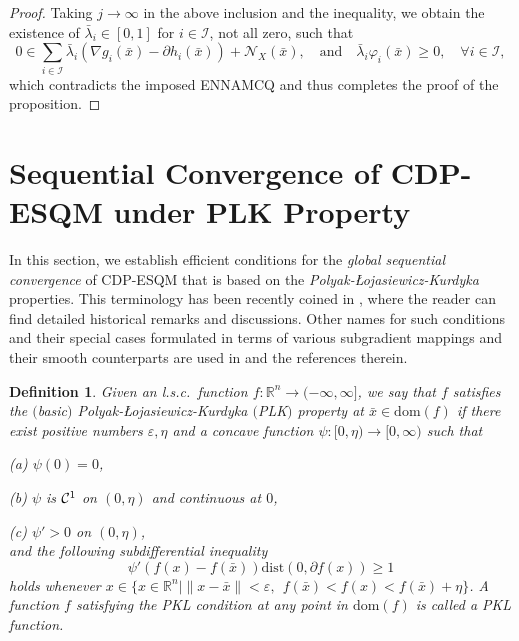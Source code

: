 \documentclass[11pt,a4paper]{article}
\newtheorem{definition}[theorem]{Definition}
\theoremstyle{plain}
\begin{document}
\begin{proof}
Taking \( j \to \infty \) in the above inclusion and the inequality,  we obtain the existence of $\bar{\lambda}_i \in [0,1]$ for $i\in\mathcal{I}$, not all zero, such that
\[
0 \in \sum_{i\in\mathcal{I}} \bar{\lambda}_i \left( \nabla g_i(\bar{x})- \partial h_i(\bar{x}) \right) + \mathcal N_X\left(\bar{x}\right), \quad \text{and} \quad \bar{\lambda}_i \varphi_{i}(\bar{x}) \ge 0, \quad \forall i\in\mathcal{I},
\]
which contradicts the imposed ENNAMCQ and thus completes the proof of the proposition.
\end{proof}\vspace*{0.05in}









\section{Sequential Convergence of CDP-ESQM under PLK Property}\label{sec:plk}
\setcounter{equation}{0}
In this section, we establish efficient conditions for the {\em global sequential convergence } of CDP-ESQM that is based on the {\em Polyak-\L ojasiewicz-Kurdyka} properties. This terminology has been recently coined in \cite{bento2025convergence}, where the reader can find detailed historical remarks and discussions. Other names for such conditions and their special cases formulated in terms of various subgradient mappings and their smooth counterparts are used in \cite{Attouch2013,Bolte2007,karimi} and the references therein.

\begin{definition}
Given an l.s.c.\ function $f:\mathbb{R}^n\to (-\infty,\infty]$,
we say that $f$ satisfies the $($basic$)$ {\em Polyak-\L ojasiewicz-Kurdyka} $($PLK$)$ property at $\bar{x} \in \mathrm{dom}(f)$ if there exist positive numbers  $\varepsilon, \eta$ and a concave function $\psi : [0,\eta) \rightarrow [0, \infty)$ such that

(a) $\psi(0) = 0$,

(b) $\psi$ is ${\cal C}^1$ on $(0,\eta)$ and continuous at $0$,

(c) $\psi' > 0$ on $(0,\eta)$, \\[1ex] 
and the following subdifferential inequality 
\[
\psi'(f(x) - f(\bar{x})) \mathrm{dist}(0, {\partial} f(x)) \ge 1
\]
holds whenever $x \in\{ x \in \mathbb{R}^n \mid  \|x - \bar{x}\| < \varepsilon, ~~ f(\bar{x}) < f(x) <f(\bar{x}) +\eta \}$.
A function $f$ satisfying the PKL condition at any point in $\mathrm{dom}(f)$ is called a {\em PKL function}.
\end{definition}
\end{document}
